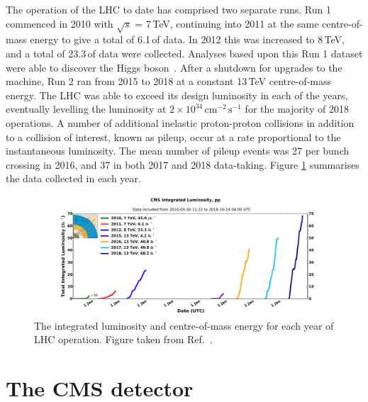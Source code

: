 The operation of the LHC to date has comprised two separate runs.
Run 1 commenced in 2010 with $\sqrt{s}$ = 7\,TeV, continuing into 2011 at the same centre-of-mass energy to give a total of 6.1\,\fb of data.
In 2012 this was increased to 8\,TeV, and a total of 23.3\,\fb of data were collected.
Analyses based upon this Run 1 dataset were able to discover the Higgs boson~\cite{ATLASdiscovery,CMSdiscovery}.
After a shutdown for upgrades to the machine, Run 2 ran from 2015 to 2018 at a constant 13\,TeV centre-of-mass energy.
The LHC was able to exceed its design luminosity in each of the years, eventually levelling the luminosity at $2\times10^{34}\,\textrm{cm}^{-2}\,\textrm{s}^{-1}$ for the majority of 2018 operations.
A number of additional inelastic proton-proton collisions in addition to a collision of interest, known as pileup, occur at a rate proportional to the instantaneous luminosity.
The mean number of pileup events was 27 per bunch crossing in 2016, and 37 in both 2017 and 2018 data-taking.
Figure \ref{fig:detector_Run1andRun2lumi} summarises the data collected in each year.

\begin{figure}[h!]
  \centering
  \includegraphics[width=\textwidth]{Figures/Detector/Run1andRun2lumi.pdf}
  \caption[LHC integrated luminosity and centre-of-mass energy per year.]
  {The integrated luminosity and centre-of-mass energy for each year of LHC operation.
  Figure taken from Ref.~\cite{CMSLumiPublic}.}
  \label{fig:detector_Run1andRun2lumi}
\end{figure}

\section{The CMS detector}

